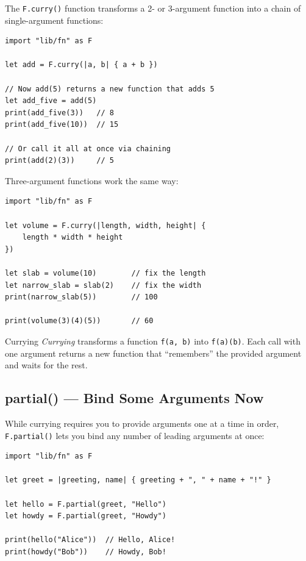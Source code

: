 The \lstinline|F.curry()| function transforms a 2- or 3-argument function into a chain of single-argument functions:

\begin{lstlisting}[language=Lattice, caption={Currying a 2-argument function}]
import "lib/fn" as F

let add = F.curry(|a, b| { a + b })

// Now add(5) returns a new function that adds 5
let add_five = add(5)
print(add_five(3))   // 8
print(add_five(10))  // 15

// Or call it all at once via chaining
print(add(2)(3))     // 5
\end{lstlisting}

Three-argument functions work the same way:

\begin{lstlisting}[language=Lattice, caption={Currying a 3-argument function}]
import "lib/fn" as F

let volume = F.curry(|length, width, height| {
    length * width * height
})

let slab = volume(10)        // fix the length
let narrow_slab = slab(2)    // fix the width
print(narrow_slab(5))        // 100

print(volume(3)(4)(5))       // 60
\end{lstlisting}

\begin{defnbox}{Currying}
\emph{Currying} transforms a function \lstinline|f(a, b)| into \lstinline|f(a)(b)|.
Each call with one argument returns a new function that ``remembers'' the provided argument and waits for the rest.
\end{defnbox}

\subsection{partial() --- Bind Some Arguments Now}\label{subsec:partial}

While currying requires you to provide arguments one at a time in order, \lstinline|F.partial()| lets you bind any number of leading arguments at once:

\begin{lstlisting}[language=Lattice, caption={Partial application}]
import "lib/fn" as F

let greet = |greeting, name| { greeting + ", " + name + "!" }

let hello = F.partial(greet, "Hello")
let howdy = F.partial(greet, "Howdy")

print(hello("Alice"))  // Hello, Alice!
print(howdy("Bob"))    // Howdy, Bob!
\end{lstlisting}

